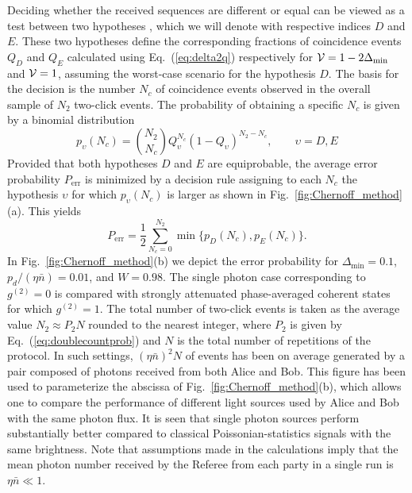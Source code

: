 \documentclass[10pt]{article}
\begin{document}
Deciding whether the received sequences are different or equal can be viewed as a test between two hypotheses \cite{Gallager}, which we will denote with respective indices $D$ and $E$. These two hypotheses define the corresponding fractions of coincidence events $Q_D$ and $Q_E$ calculated using Eq.~(\ref{eq:delta2q}) respectively for ${\cal V} = 1 - 2 \Delta_{\text{min}}$ and ${\cal V} =1$, assuming the worst-case scenario for the hypothesis $D$. The basis for the decision is the number $N_c$ of coincidence events observed in the overall sample of $N_2$ two-click events. The probability of obtaining a specific $N_c$ is given by a binomial distribution
\begin{equation}
p_{\upsilon}(N_{c})={N_2 \choose N_{c}}Q_{\upsilon}^{N_{c}}(1-Q_{\upsilon})^{N_{2}-N_{c}}, \qquad \upsilon = D, E\label{eq:binomialdistribution}
\end{equation}
Provided that both hypotheses $D$ and $E$ are equiprobable, the average error probability $P_{\text{err}}$ is minimized by a decision rule assigning to each $N_c$ the hypothesis $\upsilon$ for which $p_{\upsilon}(N_{c})$ is larger as shown in Fig.~\ref{fig:Chernoff_method}(a). This yields
\begin{equation}
P_{\text{err}}=\frac{1}{2}\sum_{N_{c}=0}^{N_{2}}\min \{p_{D}(N_{c}),p_{E}(N_{c})\}.\label{eq:numericalerror}
\end{equation}
In Fig.~\ref{fig:Chernoff_method}(b) we depict the error probability for $\Delta_{\text{min}} = 0.1$, $p_d/(\eta\bar{n}) = 0.01$, and $W=0.98$. The single photon case corresponding to $g^{(2)} = 0$ is compared with strongly attenuated phase-averaged coherent states for which $g^{(2)} = 1$. The total number of two-click events is taken as the average value $N_2 \approx P_2 N$ rounded to the nearest integer, where $P_2$ is given by Eq.~(\ref{eq:doublecountprob}) and $N$ is the total number of repetitions of the protocol. In such settings, $(\eta\bar{n})^2 N$ of events has been on average generated by a pair composed of photons received from both Alice and Bob. This figure has been used to parameterize the abscissa of Fig.~\ref{fig:Chernoff_method}(b), which allows one to compare the performance of different light sources used by Alice and Bob with the same photon flux. It is seen that single photon sources perform substantially better compared to classical Poissonian-statistics signals with the same brightness. Note that assumptions made in the calculations imply that the mean photon number received by the Referee from each party in a single run is $\eta\bar{n} \ll 1$.
\end{document}
